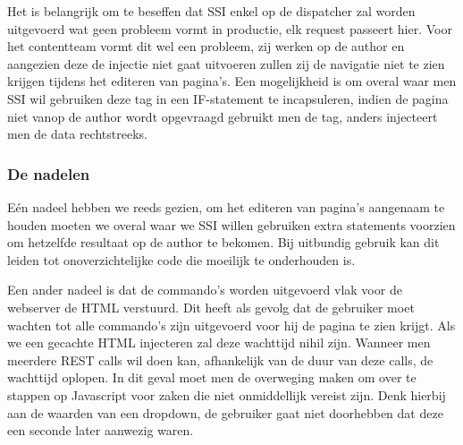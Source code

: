 \documentclass{article}
\begin{document}
    \par
    Het is belangrijk om te beseffen dat SSI enkel op de dispatcher zal worden uitgevoerd wat geen probleem vormt in productie, elk request passeert hier. Voor het contentteam vormt dit wel een probleem, zij werken op de author en aangezien deze de injectie niet gaat uitvoeren zullen zij de navigatie niet te zien krijgen tijdens het editeren van pagina's. Een mogelijkheid is om overal waar men SSI wil gebruiken deze tag in een IF-statement te incapsuleren, indien de pagina niet vanop de author wordt opgevraagd gebruikt men de tag, anders injecteert men de data rechtstreeks.
	\subsubsection{De nadelen}
    E\'en nadeel hebben we reeds gezien, om het editeren van pagina's aangenaam te houden moeten we overal waar we SSI willen gebruiken extra statements voorzien om hetzelfde resultaat op de author te bekomen. Bij uitbundig gebruik kan dit leiden tot onoverzichtelijke code die moeilijk te onderhouden is.
    \par
    Een ander nadeel is dat de commando's worden uitgevoerd vlak voor de webserver de HTML verstuurd. Dit heeft als gevolg dat de gebruiker moet wachten tot alle commando's zijn uitgevoerd voor hij de pagina te zien krijgt. Als we een gecachte HTML injecteren zal deze wachttijd nihil zijn. Wanneer men meerdere REST calls wil doen kan, afhankelijk van de duur van deze calls, de wachttijd oplopen. In dit geval moet men de overweging maken om over te stappen op Javascript voor zaken die niet onmiddellijk vereist zijn. Denk hierbij aan de waarden van een dropdown, de gebruiker gaat niet doorhebben dat deze een seconde later aanwezig waren. 
\end{document}
